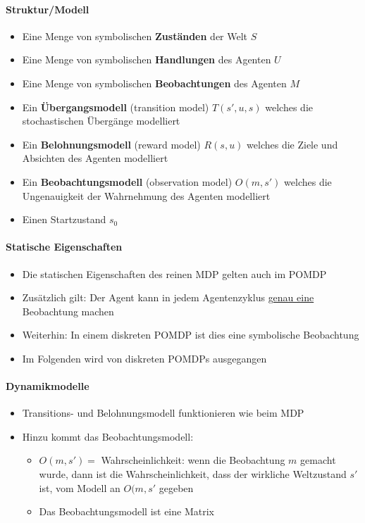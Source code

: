 \paragraph{Struktur/Modell}
\begin{itemize}
	\item Eine Menge von symbolischen \textbf{Zust\"anden} der Welt $S$
	\item Eine Menge von symbolischen \textbf{Handlungen} des Agenten $U$
	\item Eine Menge von symbolischen \textbf{Beobachtungen} des Agenten $M$
	\item Ein \textbf{\"Ubergangsmodell} (transition model) $T(s', u, s)$ welches die stochastischen \"Uberg\"ange modelliert
	\item Ein \textbf{Belohnungsmodell} (reward model) $R(s,u)$ welches die Ziele und Absichten des Agenten modelliert
	\item Ein \textbf{Beobachtungsmodell} (observation model) $O(m, s')$ welches die Ungenauigkeit der Wahrnehmung des Agenten modelliert
	\item Einen Startzustand $s_0$
\end{itemize}

\paragraph{Statische Eigenschaften}
\begin{itemize}
	\item Die statischen Eigenschaften des reinen MDP gelten auch im POMDP
	\item Zusätzlich gilt: Der Agent kann in jedem Agentenzyklus \underline{genau eine} Beobachtung machen
	\item Weiterhin: In einem diskreten POMDP ist dies eine symbolische Beobachtung
	\item Im Folgenden wird von diskreten POMDPs ausgegangen
\end{itemize}

\paragraph{Dynamikmodelle}
\begin{itemize}
	\item Transitions- und Belohnungsmodell funktionieren wie beim MDP
	\item Hinzu kommt das Beobachtungsmodell:
	\begin{itemize}
		\item $O(m,s') =$ Wahrscheinlichkeit: wenn die Beobachtung $m$ gemacht wurde, dann ist die Wahrscheinlichkeit, dass der wirkliche Weltzustand $s'$ ist, vom Modell an $O(m,s'$ gegeben
		\item Das Beobachtungsmodell ist eine Matrix
	\end{itemize}
\end{itemize}

